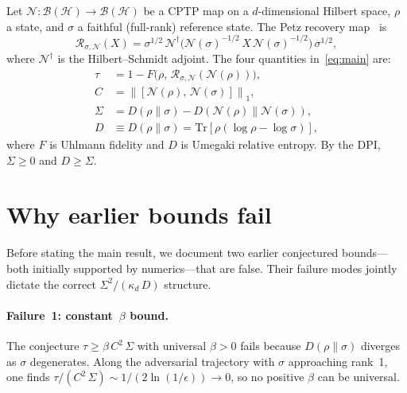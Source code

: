 \documentclass[prl,twocolumn,superscriptaddress,longbibliography,floatfix]{revtex4-2}
\newcommand{\Tr}{\mathrm{Tr}}
\newcommand{\Petz}{\mathcal{R}}
\newcommand{\chan}{\mathcal{N}}
\newcommand{\hilb}{\mathcal{H}}
\newcommand{\norm}[1]{\left\|#1\right\|}
\newcommand{\tauasym}{\tau}
\newcommand{\kd}{\kappa_d}
\begin{document}
Let $\chan: \mathcal{B}(\hilb) \to \mathcal{B}(\hilb)$ be
a CPTP map on a $d$-dimensional Hilbert space, $\rho$ a
state, and $\sigma$ a faithful (full-rank) reference state.
The Petz recovery map~\cite{Petz1986} is
\begin{equation}
\Petz_{\sigma,\chan}(X) = \sigma^{1/2}\,
\chan^\dagger\!\big(\chan(\sigma)^{-1/2}\, X\,
\chan(\sigma)^{-1/2}\big)\,\sigma^{1/2},
\label{eq:petz_def}
\end{equation}
where $\chan^\dagger$ is the Hilbert--Schmidt adjoint.
The four quantities in~\eqref{eq:main} are:
\begin{align}
\tauasym &= 1 - F\!\big(\rho,\,
  \Petz_{\sigma,\chan}(\chan(\rho))\big),
  \label{eq:tau_def} \\
C &= \norm{[\chan(\rho),\, \chan(\sigma)]}_1,
  \label{eq:C_def} \\
\Sigma &= D(\rho\|\sigma) - D(\chan(\rho)\|\chan(\sigma)),
  \label{eq:Sigma_def} \\
D &\equiv D(\rho\|\sigma) = \Tr[\rho(\log\rho - \log\sigma)],
  \label{eq:D_def}
\end{align}
where $F$ is Uhlmann fidelity and $D$ is Umegaki
relative entropy.
By the DPI, $\Sigma \geq 0$ and $D \geq \Sigma$.

\section{Why earlier bounds fail}
\label{sec:failures}

Before stating the main result, we document two earlier
conjectured bounds---both initially supported by
numerics---that are false. Their failure modes jointly
dictate the correct $\Sigma^2/(\kd\,D)$ structure.

\paragraph{Failure~1: constant~$\beta$ bound.}
The conjecture $\tauasym \geq \beta\, C^2\, \Sigma$ with
universal $\beta > 0$ fails because $D(\rho\|\sigma)$
diverges as $\sigma$ degenerates.
Along the adversarial trajectory with $\sigma$ approaching
rank~1, one finds $\tauasym/(C^2\,\Sigma) \sim
1/(2\ln(1/\epsilon)) \to 0$, so no positive $\beta$ can
be universal.
\end{document}
